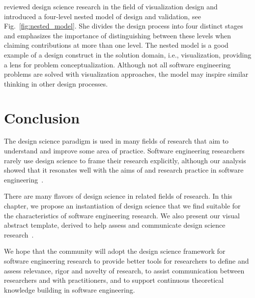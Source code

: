 \documentclass[graybox]{svmult}
\newcommand{\peggy}[1]{\textcolor{blue}{{\it [Peggy says: #1]}}}
\newcommand{\peggy}[1]{}
\begin{document}
\cite{munzner2009} reviewed design science research in the field of visualization design and introduced a four-level nested model of design and validation, see Fig.~\ref{fig:nested_model}. She divides the design process into four distinct stages and emphasizes the importance of distinguishing between these levels when claiming contributions at more than one level. The nested model is a good example of a design construct in the solution domain, i.e., visualization, providing a lens for problem conceptualization. Although not all software engineering problems are solved with visualization approaches, the model may inspire similar thinking in other design processes. 


\section{Conclusion}
\label{sec:conclusion}
The design science paradigm is used in many fields of research that aim to understand and improve some area of practice. Software engineering researchers rarely use design science to frame their research explicitly, although our analysis showed that it resonates well with the aims of and research practice in software engineering~\citep{Engstrom19arxiv}. 

There are many flavors of design science in related fields of research. In this chapter, we propose an instantiation %
of design science that we find suitable for the characteristics of software engineering research. We also present our visual abstract template, derived to help assess and communicate design science research~\citep{StoreyESEM17}. 

We hope that the community will adopt the design science framework for software engineering research to provide better tools for researchers to define and assess relevance, rigor and novelty of research, to assist communication between researchers and with practitioners, and to support continuous theoretical knowledge building in software engineering. 




\end{document}
